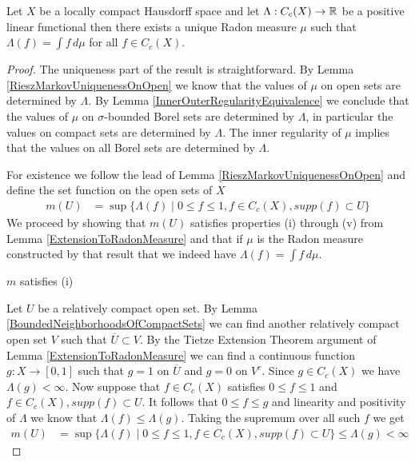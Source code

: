 \begin{thm}\label{RieszMarkov}Let $X$ be a
  locally compact Hausdorff space and let $\Lambda : C_c(X) \to
  \mathbb{R}$ be a positive linear functional then there exists a unique
  Radon measure $\mu$ such that $\Lambda(f) = \int f \, d\mu$ for all
  $f \in C_c(X)$.
\end{thm}
\begin{proof}
The uniqueness part of the result is straightforward.  By Lemma
\ref{RieszMarkovUniquenessOnOpen} we know that the values of $\mu$ on open sets
are determined by $\Lambda$.  By Lemma
\ref{InnerOuterRegularityEquivalence} we conclude that the values of
$\mu$ on $\sigma$-bounded Borel sets are determined by $\Lambda$, in
particular the values on compact sets are determined by $\Lambda$.
The inner regularity of $\mu$ implies that the values on all Borel
sets are determined by $\Lambda$.

For existence we follow the lead of Lemma
\ref{RieszMarkovUniquenessOnOpen} and define the set function on the
open sets of $X$
\begin{align*}
m(U) &=  \sup \lbrace \Lambda( f ) \mid 0 \leq f \leq 1, f \in C_c(X), supp(f) \subset U \rbrace
\end{align*}
We proceed by showing that $m(U)$ satisfies properties (i) through (v)
from Lemma \ref{ExtensionToRadonMeasure} and that if $\mu$ is the
Radon measure constructed by that result that we indeed have
$\Lambda(f) = \int f \, d\mu$.

\begin{clm}$m$ satisfies (i)
\end{clm}

Let $U$ be a relatively compact open set.  By Lemma
\ref{BoundedNeighborhoodsOfCompactSets} we can find another relatively
compact open set $V$ such that $\overline{U} \subset V$.  By the
Tietze Extension Theorem argument of Lemma \ref{ExtensionToRadonMeasure} we can find a continuous function $g: X \to
[0,1]$ such that $g = 1$ on $\overline{U}$ and $g = 0$ on $V^c$.
Since $g \in C_c(X)$ we have $\Lambda(g) < \infty$.  Now suppose that
$f \in C_c(X)$ satisfies $0 \leq f \leq 1$ and  $f \in C_c(X), supp(f)
\subset U$.  It follows that $0 \leq f \leq g$ and linearity and
positivity of $\Lambda$ we know that $\Lambda(f) \leq \Lambda(g)$.
Taking the supremum over all such $f$ we get
\begin{align*}
m(U) &= \sup \lbrace \Lambda( f ) \mid 0 \leq f \leq 1, f \in C_c(X),
supp(f) \subset U \rbrace \leq \Lambda(g) < \infty
\end{align*}


\end{proof}
